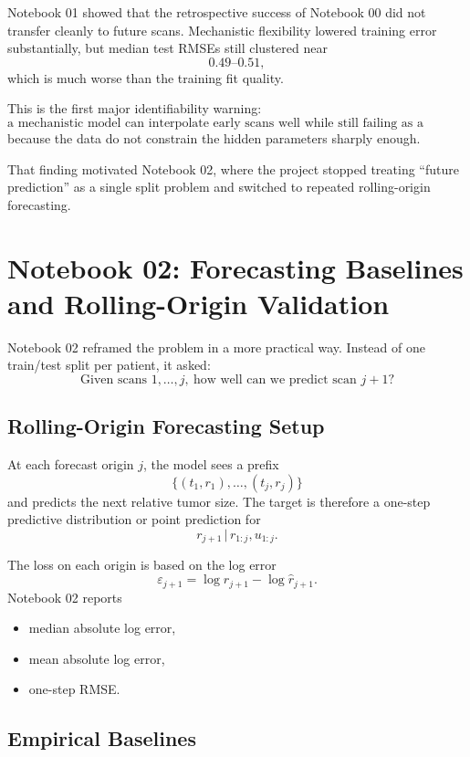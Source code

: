 \documentclass[11pt,a4paper]{article}
\newcommand{\given}{\,|\,}
\begin{document}
Notebook 01 showed that the retrospective success of Notebook 00 did not transfer cleanly to future scans. Mechanistic flexibility lowered training error substantially, but median test RMSEs still clustered near
\[
    0.49\text{--}0.51,
\]
which is much worse than the training fit quality.

This is the first major identifiability warning:
\[
\boxed{
\text{a mechanistic model can interpolate early scans well while still failing as a forecasting model}
}
\]
because the data do not constrain the hidden parameters sharply enough.

That finding motivated Notebook 02, where the project stopped treating ``future prediction'' as a single split problem and switched to repeated rolling-origin forecasting.

\section{Notebook 02: Forecasting Baselines and Rolling-Origin Validation}

Notebook 02 reframed the problem in a more practical way. Instead of one train/test split per patient, it asked:
\[
    \text{Given scans }1,\ldots,j,\ \text{how well can we predict scan }j+1?
\]

\subsection{Rolling-Origin Forecasting Setup}

At each forecast origin $j$, the model sees a prefix
\[
    \{(t_1,r_1),\ldots,(t_j,r_j)\}
\]
and predicts the next relative tumor size. The target is therefore a one-step predictive distribution or point prediction for
\[
    r_{j+1}\given r_{1:j},u_{1:j}.
\]

The loss on each origin is based on the log error
\[
    \varepsilon_{j+1}
    =
    \log r_{j+1}-\log \widehat r_{j+1}.
\]
Notebook 02 reports
\begin{itemize}[leftmargin=2em]
    \item median absolute log error,
    \item mean absolute log error,
    \item one-step RMSE.
\end{itemize}

\subsection{Empirical Baselines}
\end{document}
